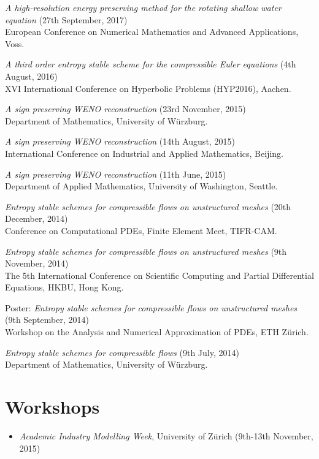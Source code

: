 \documentclass[margin]{res}
\begin{document}
\begin{resume}
              {\it A high-resolution energy preserving method for the rotating shallow water equation} (27th September, 2017)\\
               European Conference on Numerical Mathematics and Advanced Applications, Voss.
              
              {\it A third order entropy stable scheme for the compressible Euler equations} (4th August, 2016)\\
               XVI International Conference on Hyperbolic Problems (HYP2016), Aachen. 
              
              {\it A sign preserving WENO reconstruction} (23rd November, 2015)\\
               Department of Mathematics, University of W\"{u}rzburg.
              
              {\it A sign preserving WENO reconstruction} (14th August, 2015)\\
              International Conference on Industrial and Applied Mathematics, Beijing.
              
              {\it A sign preserving WENO reconstruction} (11th June, 2015)\\
              Department of Applied Mathematics, University of Washington, Seattle.
              
              {\it Entropy stable schemes for compressible flows on unstructured meshes} (20th December, 2014)\\
               Conference on Computational PDEs, Finite Element Meet, TIFR-CAM.  
              
              {\it Entropy stable schemes for compressible flows on unstructured meshes} (9th November, 2014)\\
               The 5th International Conference on Scientific Computing and Partial Differential Equations, HKBU, Hong Kong.              
             
              Poster: {\it Entropy stable schemes for compressible flows on unstructured meshes} (9th September, 2014)\\
               Workshop on the Analysis and Numerical Approximation of PDEs, ETH Z\"{u}rich.
              
              {\it Entropy stable schemes for compressible flows} (9th July, 2014)\\
               Department of Mathematics, University of W\"{u}rzburg.             

\section{Workshops} 
             \begin{itemize}
             \item {\it Academic Industry Modelling Week}, University of Z\"{u}rich  (9th-13th November, 2015) 
             

\end{itemize}
\end{resume}
\end{document}
